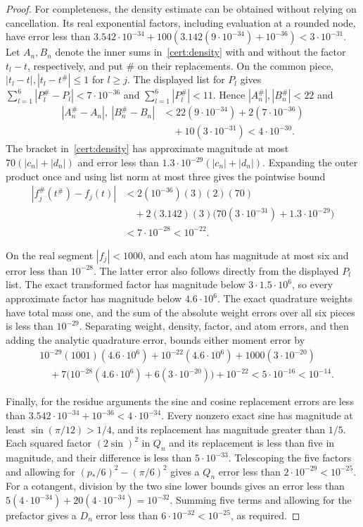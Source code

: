 \begin{proof}
For completeness, the density estimate can be obtained without relying on
cancellation.  Its real exponential factors, including evaluation at a
rounded node, have error less than
$3.542\cdot10^{-34}+100(3.142(9\cdot10^{-34})+10^{-36})<3\cdot10^{-31}$.
Let $A_n,B_n$ denote the inner sums in~\eqref{cert:density} with and without
the factor $t_l-t$, respectively, and put $\#$ on their replacements.
On the common piece, $|t_l-t|,|t_l-t^{\#}|\le1$ for $l\ge j$.
The displayed list for $P_l$ gives
$\sum_{l=1}^6|P_l^{\#}-P_l|<7\cdot10^{-36}$ and
$\sum_{l=1}^6|P_l^{\#}|<11$.  Hence $|A_n^{\#}|,|B_n^{\#}|<22$ and
\[
\begin{aligned}
 |A_n^{\#}-A_n|,\ |B_n^{\#}-B_n|
 &<22(9\cdot10^{-34})+2(7\cdot10^{-36})\\
 &\quad+10(3\cdot10^{-31})<4\cdot10^{-30}.
\end{aligned}
\]
The bracket in~\eqref{cert:density} has approximate magnitude at most
$70(|c_n|+|d_n|)$ and error less than
$1.3\cdot10^{-29}(|c_n|+|d_n|)$.  Expanding the outer product once and
using list norm at most three gives the pointwise bound
\[
\begin{aligned}
 |f_j^{\#}(t^{\#})-f_j(t)|
 &<2(10^{-36})(3)(2)(70)\\
 &\quad+2(3.142)(3)\bigl(70(3\cdot10^{-31})+1.3\cdot10^{-29}\bigr)\\
 &<7\cdot10^{-28}<10^{-22}.
\end{aligned}
\]

On the real segment $|f_j|<1000$, and each atom has magnitude at most six
and error less than $10^{-28}$.  The latter error also follows directly
from the displayed $P_l$ list.  The exact transformed factor has magnitude
below $3\cdot1.5\cdot10^6$, so every approximate factor has magnitude
below $4.6\cdot10^6$.  The exact quadrature weights have total mass one,
and the sum of the absolute weight errors over all six pieces is less than
$10^{-29}$.  Separating weight, density, factor, and atom errors, and then
adding the analytic quadrature error, bounds either moment error by
\[
\begin{split}
 &10^{-29}(1001)(4.6\cdot10^6)+10^{-22}(4.6\cdot10^6)
   +1000(3\cdot10^{-20})\\
 &\quad+7\bigl(10^{-28}(4.6\cdot10^6)+6(3\cdot10^{-20})\bigr)
   +10^{-22}<5\cdot10^{-16}<10^{-14}.
\end{split}
\]

Finally, for the residue arguments the sine and cosine replacement errors
are less than $3.542\cdot10^{-34}+10^{-36}<4\cdot10^{-34}$.
Every nonzero exact sine has magnitude at least $\sin(\pi/12)>1/4$, and
its replacement has magnitude greater than $1/5$.  Each squared factor
$(2\sin)^2$ in $Q_n$ and its replacement is less than five in magnitude,
and their difference is less than $5\cdot10^{-33}$.  Telescoping the five
factors and allowing for $(p_*/6)^2-(\pi/6)^2$ gives a $Q_n$ error less
than $2\cdot10^{-29}<10^{-25}$.  For a cotangent, division by the two sine
lower bounds gives an error less than
$5(4\cdot10^{-34})+20(4\cdot10^{-34})=10^{-32}$.
Summing five terms and allowing for the prefactor gives a $D_n$ error less
than $6\cdot10^{-32}<10^{-25}$, as required.
\end{proof}

